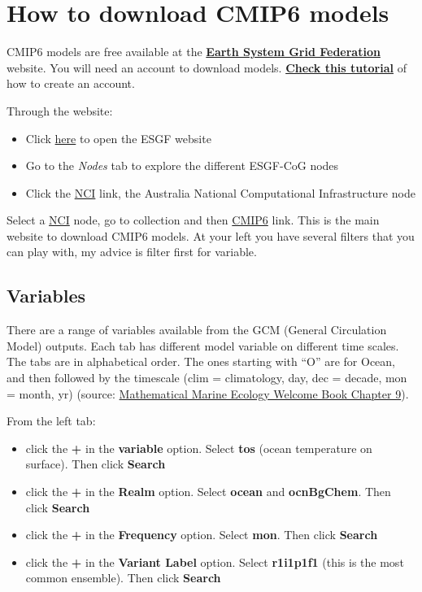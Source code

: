\documentclass[]{book}
\providecommand{\tightlist}{%
  \setlength{\itemsep}{0pt}\setlength{\parskip}{0pt}}
\begin{document}
\hypertarget{how-to-download-cmip6-models}{%
\section{How to download CMIP6 models}\label{how-to-download-cmip6-models}}

CMIP6 models are free available at the \href{https://esgf.llnl.gov/}{\textbf{Earth System Grid Federation}} website. You will need an account to download models. \href{https://esgf.github.io/esgf-user-support/user_guide.html}{\textbf{Check this tutorial}} of how to create an account.

Through the website:

\begin{itemize}
\tightlist
\item
  Click \href{https://esgf.llnl.gov/}{here} to open the ESGF website
\item
  Go to the \emph{Nodes} tab to explore the different ESGF-CoG nodes
\item
  Click the \href{https://esgf.nci.org.au/projects/esgf-nci/}{NCI} link, the Australia National Computational Infrastructure node
\end{itemize}

Select a \href{https://esgf.nci.org.au/projects/esgf-nci/}{NCI} node, go to collection and then \href{https://esgf.nci.org.au/search/cmip6-nci/}{CMIP6} link. This is the main website to download CMIP6 models. At your left you have several filters that you can play with, my advice is filter first for variable.

\hypertarget{variables}{%
\subsection{Variables}\label{variables}}

There are a range of variables available from the GCM (General Circulation Model) outputs. Each tab has different model variable on different time scales. The tabs are in alphabetical order. The ones starting with ``O'' are for Ocean, and then followed by the timescale (clim = climatology, day, dec = decade, mon = month, yr) (source: \href{https://mathmarecol.github.io/Welcome/}{Mathematical Marine Ecology Welcome Book Chapter 9}).

From the left tab:

\begin{itemize}
\tightlist
\item
  click the \textbf{+} in the \textbf{variable} option. Select \textbf{tos} (ocean temperature on surface). Then click \textbf{Search}
\item
  click the \textbf{+} in the \textbf{Realm} option. Select \textbf{ocean} and \textbf{ocnBgChem}. Then click \textbf{Search}
\item
  click the \textbf{+} in the \textbf{Frequency} option. Select \textbf{mon}. Then click \textbf{Search}
\item
  click the \textbf{+} in the \textbf{Variant Label} option. Select \textbf{r1i1p1f1} (this is the most common ensemble). Then click \textbf{Search}
\end{itemize}
\end{document}
